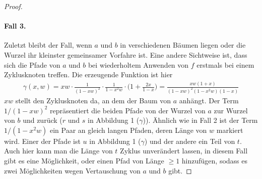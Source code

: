\documentclass[a4paper, 10pt, ngerman]{article}
\begin{document}
\begin{proof}
    \paragraph{Fall 3.} Zuletzt bleibt der Fall, wenn $a$ und $b$ in verschiedenen Bäumen liegen oder die Wurzel ihr kleinster gemeinsamer Vorfahre ist. Eine andere Sichtweise ist, dass sich die Pfade von $a$ und $b$ bei wiederholtem Anwenden von $f$ erstmals bei einem Zyklusknoten treffen. Die erzeugende Funktion ist hier
    \begin{align*}
        \gamma(x, w)
        = xw \cdot \frac {1} {(1 - xw)^2} \cdot \frac {1} {1 - x^2w} \cdot \Bigg (1 + \frac {2x}{1 - x} \Bigg )
        = \frac {xw(1 + x)} {(1 - xw)^2(1 - x^2w)(1 - x)}
    \end{align*}
    $xw$ stellt den Zyklusknoten da, an dem der Baum von $a$ anhängt. Der Term $1/(1 - xw)^2$ repräsentiert die beiden Pfade von der Wurzel von $a$ zur Wurzel von $b$ und zurück ($r$ und $s$ in Abbildung 1 ($\gamma$)). Ähnlich wie in Fall 2 ist der Term $1/(1 - x^2w)$ ein Paar an gleich langen Pfaden, deren Länge von $w$ markiert wird. Einer der Pfade ist $u$ in Abbildung 1 ($\gamma$) und der andere ein Teil von $t$. Auch hier kann man die Länge von $t$ Zyklus unverändert lassen, in diesem Fall gibt es eine Möglichkeit, oder einen Pfad von Länge $\ge 1$ hinzufügen, sodass es zwei Möglichkeiten wegen Vertauschung von $a$ und $b$ gibt.


\end{proof}
\end{document}
